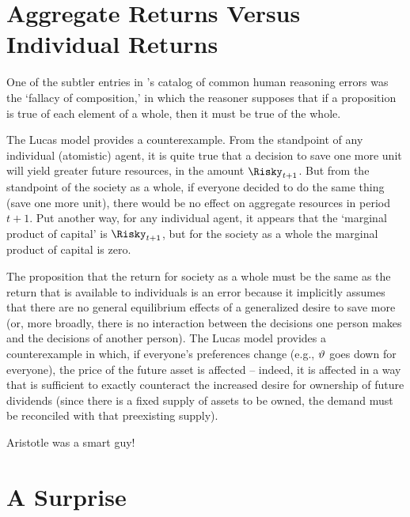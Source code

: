 \documentclass{\handout}
\begin{document}
\hypertarget{aggregate-returns-versus-individual-returns}{}
\section{Aggregate Returns Versus Individual Returns}

One of the subtler entries in \cite{aristotleFallacies}'s catalog of common human reasoning errors was the `fallacy of composition,' in which the reasoner supposes that if a proposition is true of each element of a whole, then it must be true of the whole.

The Lucas model provides a counterexample.  From the standpoint of any individual (atomistic) agent, it is quite true that a decision to save one more unit will yield greater future resources, in the amount $\Risky_{t+1}$.  But from the standpoint of the society as a whole, if everyone decided to do the same thing (save one more unit), there would be no effect on aggregate resources in period $t+1$.  Put another way, for any individual agent, it appears that the `marginal product of capital' is $\Risky_{t+1}$, but for the society as a whole the marginal product of capital is zero.

The proposition that the return for society as a whole must be the same as the return that is available to individuals is an error because it implicitly assumes that there are no general equilibrium effects of a generalized desire to save more (or, more broadly, there is no interaction between the decisions one person makes and the decisions of another person).  The Lucas model provides a counterexample in which, if everyone's preferences change (e.g., $\vartheta$ goes down for everyone), the price of the future asset is affected -- indeed, it is affected in a way that is sufficient to exactly counteract the increased desire for ownership of future dividends (since there is a fixed supply of assets to be owned, the demand must be reconciled with that preexisting supply).

Aristotle was a smart guy!

\hypertarget{a-surprise}{}
\section{A Surprise}
\end{document}
